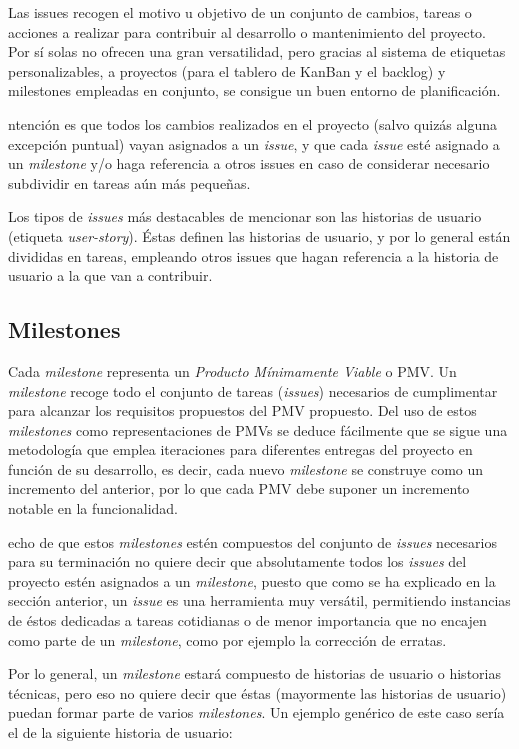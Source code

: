 Las issues recogen el motivo u objetivo de un conjunto de cambios, tareas o acciones a realizar para contribuir al desarrollo o mantenimiento del proyecto. Por sí solas no ofrecen una gran versatilidad, pero gracias al sistema de etiquetas personalizables, a proyectos (para el tablero de KanBan y el backlog) y milestones empleadas en conjunto, se consigue un buen entorno de planificación.

ntención es que todos los cambios realizados en el proyecto (salvo quizás alguna excepción puntual) vayan asignados a un \textit{issue}, y que cada \textit{issue} esté asignado a un \textit{milestone} y/o haga referencia a otros issues en caso de considerar necesario subdividir en tareas aún más pequeñas.

Los tipos de \textit{issues} más destacables de mencionar son las historias de usuario (etiqueta \textit{user-story}). Éstas definen las historias de usuario, y por lo general están divididas en tareas, empleando otros issues que hagan referencia a la historia de usuario a la que van a contribuir.

\subsection{Milestones}

Cada \textit{milestone} representa un \textit{Producto Mínimamente Viable} o PMV. Un \textit{milestone} recoge todo el conjunto de tareas (\textit{issues}) necesarios de cumplimentar para alcanzar los requisitos propuestos del PMV propuesto. Del uso de estos \textit{milestones} como representaciones de PMVs se deduce fácilmente que se sigue una metodología que emplea iteraciones para diferentes entregas del proyecto en función de su desarrollo, es decir, cada nuevo \textit{milestone} se construye como un incremento del anterior, por lo que cada PMV debe suponer un incremento notable en la funcionalidad.

echo de que estos \textit{milestones} estén compuestos del conjunto de \textit{issues} necesarios para su terminación no quiere decir que absolutamente todos los \textit{issues} del proyecto estén asignados a un \textit{milestone}, puesto que como se ha explicado en la sección anterior, un \textit{issue} es una herramienta muy versátil, permitiendo instancias de éstos dedicadas a tareas cotidianas o de menor importancia que no encajen como parte de un \textit{milestone}, como por ejemplo la corrección de erratas.

Por lo general, un \textit{milestone} estará compuesto de historias de usuario o historias técnicas, pero eso no quiere decir que éstas (mayormente las historias de usuario) puedan formar parte de varios \textit{milestones}. Un ejemplo genérico de este caso sería el de la siguiente historia de usuario:

